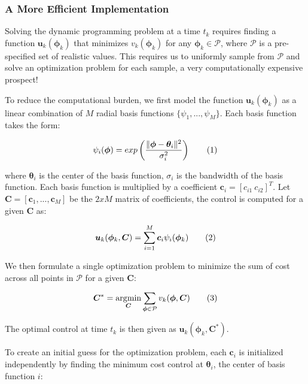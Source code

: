 \documentclass{article} %
\newcommand\numberthis{\addtocounter{equation}{1}\tag{\theequation}}
\DeclareMathOperator*{\argmin}{\arg\!\min}
\begin{document}
\subsubsection{A More Efficient Implementation}
\label{section_implementation}

Solving the dynamic programming problem at a time $t_k$ requires finding a function
$\bm{u}_k(\bm{\phi}_k)$ that minimizes $v_k(\bm{\phi}_k)$ for any
$\bm{\phi}_k \in \mathcal{P}$, where $\mathcal{P}$ is a pre-specified
set of realistic values. This requires us to uniformly
sample from $\mathcal{P}$ and solve an optimization problem for each sample, a
very computationally expensive prospect!

To reduce the computational burden, we first model the function $\bm{u}_k(\bm{\phi}_k)$
as a linear combination of $M$ radial basis functions
$\{ \psi_1, ..., \psi_M \}$. Each basis function takes the form:

\begin{align*}
\psi_i(\bm{\phi}) = exp \left( \frac{\| \bm{\phi} - \bm{\theta}_i \| ^2 }{\sigma_i ^2} \right) \numberthis \label{eq_rbf} 
\end{align*}

where $\bm{\theta}_i$ is the center of the basis function, $\sigma_i$ is the bandwidth of
the basis function. Each basis function is multiplied by a coefficient
$\bm{c}_i = \left[ c_{i1} ~ c_{i2} \right]^T$. Let $\bm{C}=\left[ \bm{c}_1, ... ,\bm{c}_M \right]$
be the $2xM$ matrix of coefficients, the control is computed for a given $\bm{C}$ as:

\begin{align*}
\bm{u}_k(\bm{\phi}_k, \bm{C}) = \sum_{i=1}^M \bm{c}_i \psi_i(\bm{\phi}_k)  \numberthis \label{eq_u_rbf}
\end{align*}

We then formulate a single optimization problem to minimize the sum of cost
across all points in $\mathcal{P}$ for a given $\bm{C}$:

\begin{align*}
\bm{C}^* = \argmin_{\bm{C}} \sum_{\bm{\phi} \in \mathcal{P}} v_k( \bm{\phi}, \bm{C} )  \numberthis \label{eq_cstar}
\end{align*}

The optimal control at time $t_k$ is then given as $\bm{u}_k(\bm{\phi}_k, \bm{C}^*)$.

To create an initial guess for the optimization problem, each $\bm{c}_i$ is initialized
independently by finding the minimum cost control at $\bm{\theta}_i$, the center of
basis function $i$:
   
\end{document}
